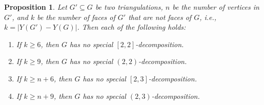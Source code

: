 \documentclass[a4paper,10pt]{article}
\theoremstyle{plain}
\newtheorem{prop}[thm]{Proposition}
\begin{document}
\begin{prop}\label{prop:tightness}
 Let $G' \subseteq G$ be two triangulations, $n$ be the number of vertices in $G'$, and $k$ be the number of faces of $G'$ that are not faces of $G$, i.e., $k = |Y(G')-Y(G)|$.
 Then each of the following holds:
 \begin{enumerate}[label=(\roman*)]
  \item If $k \geq 6$, then $G$ has no special $[2,2]$-decomposition.\label{enum:[2,2]}
  \item If $k \geq 9$, then $G$ has no special $(2,2)$-decomposition.\label{enum:(2,2)}
  \item If $k \geq n+6$, then $G$ has no special $[2,3]$-decomposition.\label{enum:[2,3]}
  \item If $k \geq n+9$, then $G$ has no special $(2,3)$-decomposition.\label{enum:(2,3)}
 \end{enumerate}
\end{prop}
%
\end{document}
